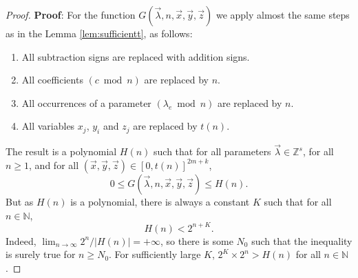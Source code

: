 \documentclass[10pt,a4paper]{amsart}
\begin{document}
\begin{proof}
{\bf Proof}: For the function $G(\vec \lambda, n, \vec x, \vec y, \vec z)$ we apply almost the same steps as in the Lemma \ref{lem:sufficientt}, as follows: 
\begin{enumerate}
    \item All subtraction signs are replaced with addition signs.
    \item All coefficients $(c \bmod n)$ are replaced by $n$.
    \item All occurrences of a parameter $(\lambda_{e} \bmod n) $ are replaced by $n$.
    \item All variables $x_j$, $y_i$ and $z_j$ are replaced by $t(n)$. 
\end{enumerate} 
The result is a polynomial $H(n)$ such that for all parameters $\vec \lambda \in \mathbb Z^s$, for all $n \geq 1$, and for all $(\vec x, \vec y, \vec z) \in [0, t(n)]^{2m+k}$, 
$$0 \leq G(\vec \lambda,n, \vec x, \vec y, \vec z) \leq H(n). $$
But as $H(n)$ is a polynomial, there is always a constant $K$ such that for all $n \in \mathbb N$, 
$$H(n) < 2^{n+K}.$$
Indeed, $\lim_{n \rightarrow \infty} 2^n / |H(n)| = + \infty$, so there is some $N_0$ such that the inequality is surely true for $n \geq N_0$. For sufficiently large $K$, $2^K \times 2^n > H(n)$ for all $n \in \mathbb N$. 
\end{proof}
\end{document}
